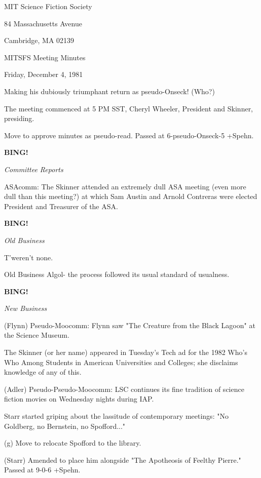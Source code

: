 \documentclass[12pt]{article}
\newcommand{\bing}{{\bf BING!} }
\newcommand{\goto}[1]{\bing \vskip 12pt \centerline{{\em{#1}}}}
\begin{document}
\begin{center}

MIT Science Fiction Society 

84 Massachusetts Avenue

Cambridge, MA 02139

\vspace{12pt}

MITSFS Meeting Minutes 

Friday, December 4, 1981

\end{center}
 
\vspace{18pt}

\setlength{\parskip}{6pt}

\noindent
Making his dubiously triumphant return as pseudo-Onseck! (Who?)

The meeting commenced at 5 PM SST,
Cheryl Wheeler, President and Skinner, presiding.

Move to approve minutes as pseudo-read. Passed at 6-pseudo-Onseck-5 +Spehn.

\goto{Committee Reports}

ASAcomm: The Skinner attended an extremely dull ASA meeting (even more dull than this meeting?) at which Sam Austin and Arnold Contreras were elected President and Treasurer of the ASA.

\goto{Old Business}

T'weren't none.

Old Business Algol- the process followed its usual standard of usualness.

\goto{New Business}

(Flynn) Pseudo-Moocomm: Flynn saw "The Creature from the Black Lagoon" at the Science Museum.

The Skinner (or her name) appeared in Tuesday's Tech ad for the 1982 Who's Who Among Students in American Universities and Colleges; she disclaims knowledge of any of this.

(Adler) Pseudo-Pseudo-Moocomm: LSC continues its fine tradition of science fiction movies on Wednesday nights during IAP.

Starr started griping about the lassitude of contemporary meetings: "No Goldberg, no Bernstein, no Spofford..."

(g) Move to relocate Spofford to the library.

(Starr) Amended to place him alongside "The Apotheosis of Feelthy Pierre." Passed at 9-0-6 +Spehn.
\end{document}
